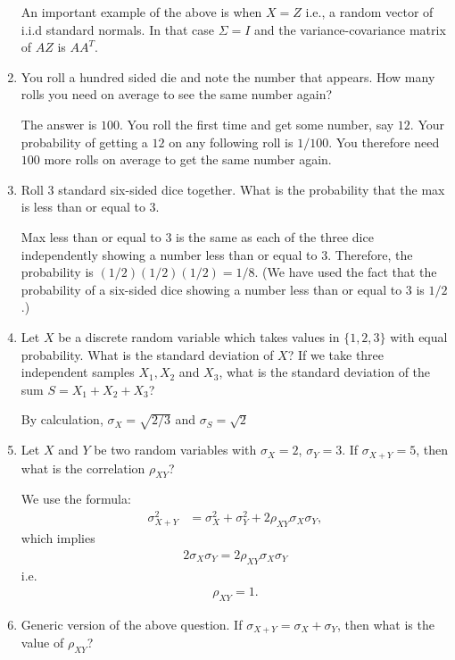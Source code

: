 \documentclass{amsart}
\theoremstyle{plain}
\numberwithin{equation}{section}
\begin{document}
\begin{enumerate}
An important example of the above is when $X=Z$ i.e.,
a random vector of i.i.d standard normals. In that case
$\Sigma = I$ and the variance-covariance matrix 
of $AZ$ is $AA^T$.

\item You roll a hundred sided die and note the number 
that appears. How many rolls you need on average 
to see the same number again?

The answer is $100$. You roll the first time and get 
some number, say $12$. Your probability of getting a $12$
on any following roll is $1/100$. You therefore need
$100$ more rolls on average to get the same number again. 

\item Roll $3$ standard six-sided dice together. What is the 
probability that the max is less than or equal to $3$.

Max less than or equal to $3$ is the same as each of the 
three dice independently showing a number less than or equal to $3$. 
Therefore, the probability is $(1/2)(1/2)(1/2) = 1/8$. (We have used the fact
that the probability of a six-sided dice showing a 
number less than or equal to $3$ is $1/2$.)

\item Let $X$ be a discrete random variable which
takes values in $\lbrace 1, 2, 3 \rbrace$ with 
equal probability. What is the standard deviation of $X$?
If we take three independent samples $X_1, X_2$ and 
$X_3$, what is the standard deviation of the sum 
$S = X_1 + X_2 + X_3$?

By calculation, $\sigma_X = \sqrt{2/3}$ and 
$\sigma_S = \sqrt{2}$

\item Let $X$ and $Y$ be two random variables with
$\sigma_X=2$, $\sigma_Y=3$. If $\sigma_{X+Y} = 5$, 
then what is the correlation $\rho_{XY}$?

We use the formula:
\begin{align*}
\sigma_{X+Y}^2 &= \sigma_{X}^2 + \sigma_{Y}^2 + 2 \rho_{XY} \sigma_X \sigma_Y,
\end{align*}
which implies
\begin{align*}
2 \sigma_X \sigma_Y = 
2 \rho_{XY} \sigma_X \sigma_Y
\end{align*}
i.e.\,
\begin{align*}
\rho_{XY} = 1.
\end{align*}

\item Generic version of the above question. If 
$\sigma_{X+Y} = \sigma_X + \sigma_Y$, then what is the 
value of $\rho_{XY}$?


\end{enumerate}
\end{document}
